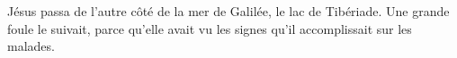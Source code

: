 \encetemps
	Jésus passa de l’autre côté de la mer de Galilée, le lac de Tibériade.
Une grande foule le suivait,
	parce qu’elle avait vu les signes qu’il accomplissait sur les malades.

